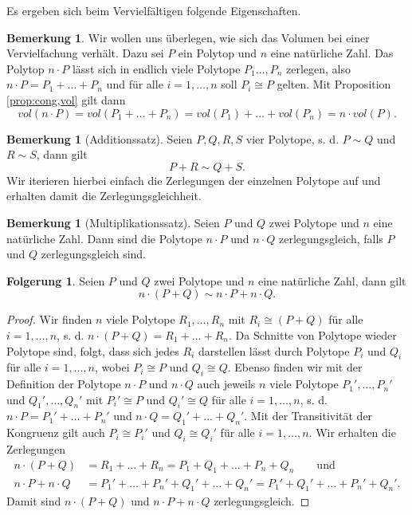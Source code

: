 \documentclass[11pt,titlepage]{article}
\theoremstyle{definition}
\newtheorem{corollary}[theorem]{Folgerung}
\newtheorem{remark}[theorem]{Bemerkung}
\theoremstyle{remark}
\begin{document}
	Es ergeben sich beim Vervielfältigen folgende Eigenschaften.
	
	\begin{remark}\label{bem:vervielf;vol}
		Wir wollen uns überlegen, wie sich das Volumen bei einer Vervielfachung 
		verhält. Dazu sei $P$ ein Polytop und $n$ eine natürliche Zahl. 
		Das Polytop $n\cdot P$ lässt sich in endlich viele Polytope 
		$P_1\ldots,P_n$ zerlegen, also $n\cdot P=P_1+\ldots+P_n$ und für alle 
		$i=1,\ldots,n$ soll $P_i\cong P$ gelten. Mit Proposition 
		\ref{prop:cong,vol} gilt dann 
		\[vol(n\cdot P)=vol(P_1+\ldots+P_n)=vol(P_1)+\ldots+vol(P_n)=n\cdot vol(P).\]
	\end{remark}
	
	\begin{remark}[Additionssatz] \label{bem:addsatz}
		Seien $P,Q,R,S$ vier Polytope, s. d. $P\sim Q$ und $R\sim S$, dann gilt
		\[P+R\sim Q+S.\]
		Wir iterieren hierbei einfach die Zerlegungen der einzelnen Polytope 
		auf und erhalten damit die Zerlegungsgleichheit.
	\end{remark}
	
	\begin{remark}[Multiplikationssatz] \label{bem:multsatz}
		Seien $P$ und $Q$ zwei Polytope und $n$ eine natürliche Zahl. 
		Dann sind die Polytope $n\cdot P$ und $n\cdot Q$ zerlegungsgleich, falls 
		$P$ und $Q$ zerlegungsgleich sind.
	\end{remark}
	
	\begin{corollary} \label{coroll:vervielfältigung}
		Seien $P$ und $Q$ zwei Polytope und $n$ eine natürliche Zahl, dann gilt
		\[n\cdot(P+Q)\sim n\cdot P+n\cdot Q.\]
	\end{corollary}
	
	\begin{proof}
		Wir finden $n$ viele Polytope $R_1,\ldots,R_n$ mit 
		$R_i\cong (P+Q)$ für alle $i=1,\ldots,n$, s. d. 
		$n\cdot(P+Q)=R_1+\ldots+R_n$. Da Schnitte von Polytope wieder 
		Polytope sind, folgt, dass sich jedes 
		$R_i$ darstellen lässt durch Polytope $P_i$ und $Q_i$ für alle 
		$i=1,\ldots,n$, wobei $P_i\cong P$ und $Q_i\cong Q$. Ebenso finden wir 
		mit der Definition der Polytope $n\cdot P$ und $n\cdot Q$ auch jeweils 
		$n$ viele Polytope 
		$P_1',\ldots,P_n'$ und $Q_1',\ldots,Q_n'$ mit $P_i'\cong P$ und 
		$Q_i'\cong Q$ für alle $i=1,\ldots,n$, s. d. $n\cdot P=P_1'+\ldots+P_n'$ und 
		$n\cdot Q=Q_1'+\ldots+Q_n'$. Mit der Transitivität der Kongruenz 
		gilt auch $P_i\cong P_i'$ und $Q_i\cong Q_i'$ für alle 
		$i=1,\ldots,n$. Wir erhalten die Zerlegungen
		\begin{align*}
		n\cdot(P+Q)&=R_1+\ldots+R_n=P_1+Q_1+\ldots+P_n+Q_n \qquad\text{und}\\
		n\cdot P+n\cdot Q&=P_1'+\ldots+P_n'+Q_1'+\ldots+Q_n'=
		P_1'+Q_1'+\ldots+P_n'+Q_n'.
		\end{align*}
		Damit sind $n\cdot (P+Q)$ und $n\cdot P+n\cdot Q$ zerlegungsgleich.
	\end{proof}
\end{document}
